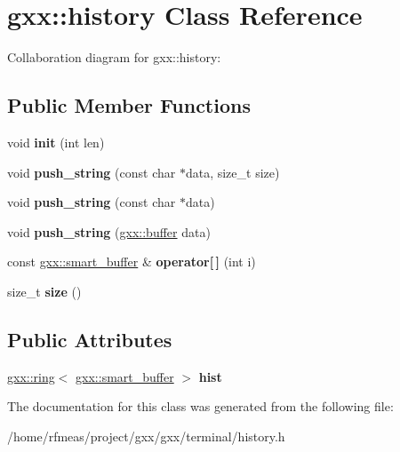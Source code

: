 \hypertarget{classgxx_1_1history}{}\section{gxx\+:\+:history Class Reference}
\label{classgxx_1_1history}


Collaboration diagram for gxx\+:\+:history\+:
\subsection*{Public Member Functions}
\begin{DoxyCompactItemize}
\item 
void {\bfseries init} (int len)\hypertarget{classgxx_1_1history_a4982a43d254c97182b14dfedc9d61ca4}{}\label{classgxx_1_1history_a4982a43d254c97182b14dfedc9d61ca4}

\item 
void {\bfseries push\+\_\+string} (const char $\ast$data, size\+\_\+t size)\hypertarget{classgxx_1_1history_adbb9c466738dc966c61f2b4bc60d4517}{}\label{classgxx_1_1history_adbb9c466738dc966c61f2b4bc60d4517}

\item 
void {\bfseries push\+\_\+string} (const char $\ast$data)\hypertarget{classgxx_1_1history_ae101313c2b1d5635ae8c02478f8b0e64}{}\label{classgxx_1_1history_ae101313c2b1d5635ae8c02478f8b0e64}

\item 
void {\bfseries push\+\_\+string} (\hyperlink{classgxx_1_1buffer}{gxx\+::buffer} data)\hypertarget{classgxx_1_1history_a400ebe4d86e56a704d65289438812b37}{}\label{classgxx_1_1history_a400ebe4d86e56a704d65289438812b37}

\item 
const \hyperlink{classgxx_1_1smart__buffer}{gxx\+::smart\+\_\+buffer} \& {\bfseries operator\mbox{[}$\,$\mbox{]}} (int i)\hypertarget{classgxx_1_1history_ae3c65ffbe0fa47c99767e55dbecfb55f}{}\label{classgxx_1_1history_ae3c65ffbe0fa47c99767e55dbecfb55f}

\item 
size\+\_\+t {\bfseries size} ()\hypertarget{classgxx_1_1history_a8add213df7e01564383698a8adf86568}{}\label{classgxx_1_1history_a8add213df7e01564383698a8adf86568}

\end{DoxyCompactItemize}
\subsection*{Public Attributes}
\begin{DoxyCompactItemize}
\item 
\hyperlink{classgxx_1_1ring}{gxx\+::ring}$<$ \hyperlink{classgxx_1_1smart__buffer}{gxx\+::smart\+\_\+buffer} $>$ {\bfseries hist}\hypertarget{classgxx_1_1history_a73e542175fc42e41b43c9e9580ba9d95}{}\label{classgxx_1_1history_a73e542175fc42e41b43c9e9580ba9d95}

\end{DoxyCompactItemize}


The documentation for this class was generated from the following file\+:\begin{DoxyCompactItemize}
\item 
/home/rfmeas/project/gxx/gxx/terminal/history.\+h\end{DoxyCompactItemize}
